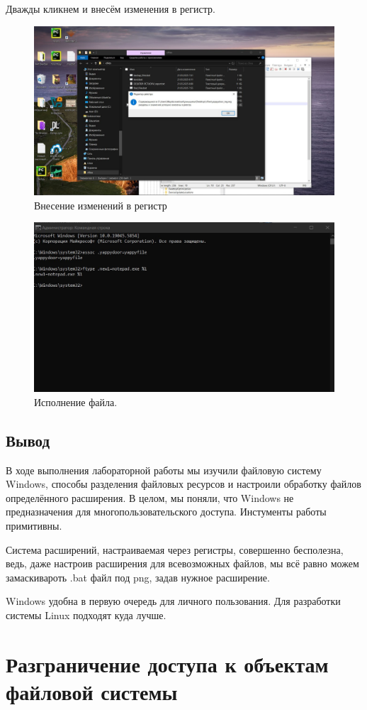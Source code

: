 Дважды кликнем и внесём изменения в регистр.

\begin{figure}[h!]
    \centering
    \includegraphics[width=0.5\linewidth]{Pic/lab2/photo_2025-05-22_00-26-24.jpg}
    \caption{Внесение изменений в регистр}
    \label{fig:REGChange}
\end{figure}

\begin{figure}[h!]
    \centering
    \includegraphics[width=0.5\linewidth]{Pic/lab2/photo_2025-05-22_00-26-29.jpg}
    \caption{Исполнение файла.}
    \label{fig:new_extend}
\end{figure}

\subsection{Вывод}

В ходе выполнения лабораторной работы мы изучили файловую систему Windows, способы разделения файловых ресурсов и настроили обработку файлов определённого расширения. В целом, мы поняли, что Windows не предназначения для многопользовательского доступа. Инстументы работы примитивны. 

Система расширений, настраиваемая через регистры, совершенно бесполезна, ведь, даже настроив расширения для всевозможных файлов, мы всё равно можем замаскивароть .bat файл под png, задав нужное расширение. 

Windows удобна в первую очередь для личного пользования. Для разработки системы Linux подходят куда лучше. 

\newpage
\section{Разграничение доступа к объектам файловой системы}

